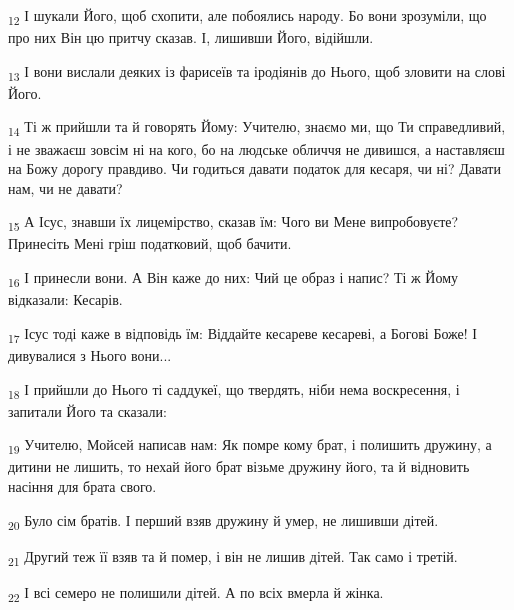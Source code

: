 \begin{tcolorbox}
\textsubscript{12} І шукали Його, щоб схопити, але побоялись народу. Бо вони зрозуміли, що про них Він цю притчу сказав. І, лишивши Його, відійшли.
\end{tcolorbox}
\begin{tcolorbox}
\textsubscript{13} І вони вислали деяких із фарисеїв та іродіянів до Нього, щоб зловити на слові Його.
\end{tcolorbox}
\begin{tcolorbox}
\textsubscript{14} Ті ж прийшли та й говорять Йому: Учителю, знаємо ми, що Ти справедливий, і не зважаєш зовсім ні на кого, бо на людське обличчя не дивишся, а наставляєш на Божу дорогу правдиво. Чи годиться давати податок для кесаря, чи ні? Давати нам, чи не давати?
\end{tcolorbox}
\begin{tcolorbox}
\textsubscript{15} А Ісус, знавши їх лицемірство, сказав їм: Чого ви Мене випробовуєте? Принесіть Мені гріш податковий, щоб бачити.
\end{tcolorbox}
\begin{tcolorbox}
\textsubscript{16} І принесли вони. А Він каже до них: Чий це образ і напис? Ті ж Йому відказали: Кесарів.
\end{tcolorbox}
\begin{tcolorbox}
\textsubscript{17} Ісус тоді каже в відповідь їм: Віддайте кесареве кесареві, а Богові Боже! І дивувалися з Нього вони...
\end{tcolorbox}
\begin{tcolorbox}
\textsubscript{18} І прийшли до Нього ті саддукеї, що твердять, ніби нема воскресення, і запитали Його та сказали:
\end{tcolorbox}
\begin{tcolorbox}
\textsubscript{19} Учителю, Мойсей написав нам: Як помре кому брат, і полишить дружину, а дитини не лишить, то нехай його брат візьме дружину його, та й відновить насіння для брата свого.
\end{tcolorbox}
\begin{tcolorbox}
\textsubscript{20} Було сім братів. І перший взяв дружину й умер, не лишивши дітей.
\end{tcolorbox}
\begin{tcolorbox}
\textsubscript{21} Другий теж її взяв та й помер, і він не лишив дітей. Так само і третій.
\end{tcolorbox}
\begin{tcolorbox}
\textsubscript{22} І всі семеро не полишили дітей. А по всіх вмерла й жінка.
\end{tcolorbox}
